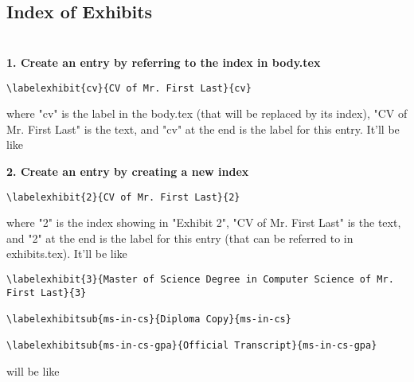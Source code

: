 \begin{center}
    \section{\fontsize{20}{0}\selectfont Index of Exhibits}
\end{center}

\section{}

\vspace{5mm}
\textbf{1. Create an entry by referring to the index in body.tex}
\begin{verbatim}
\labelexhibit{cv}{CV of Mr. First Last}{cv}
\end{verbatim}
where "cv" is the label in the body.tex (that will be replaced by its index), "CV of Mr. First Last" is the text, and "cv" at the end is the label for this entry. It'll be like


\vspace{5mm}
\textbf{2. Create an entry by creating a new index}
\begin{verbatim}
\labelexhibit{2}{CV of Mr. First Last}{2}
\end{verbatim}
where "2" is the index showing in "Exhibit 2", "CV of Mr. First Last" is the text, and "2" at the end is the label for this entry (that can be referred to in exhibits.tex). It'll be like

\vspace{5mm}

\vspace{5mm}

\begin{verbatim}
\labelexhibit{3}{Master of Science Degree in Computer Science of Mr. First Last}{3}

\labelexhibitsub{ms-in-cs}{Diploma Copy}{ms-in-cs}

\labelexhibitsub{ms-in-cs-gpa}{Official Transcript}{ms-in-cs-gpa}
\end{verbatim} will be like


